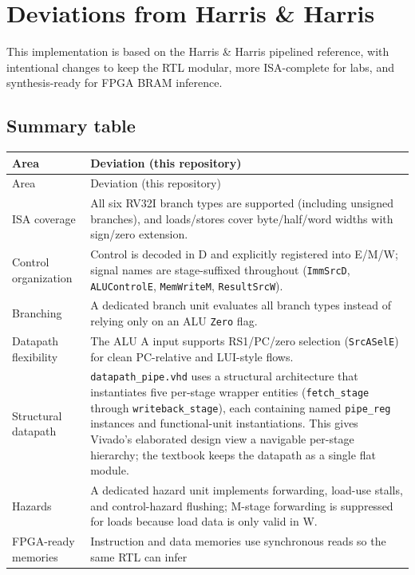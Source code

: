 \section{Deviations from Harris \& Harris}
\label{sec:textbook-deviations}

This implementation is based on the Harris \& Harris pipelined reference, with
intentional changes to keep the RTL modular, more ISA-complete for labs, and
synthesis-ready for FPGA BRAM inference.

\subsection{Summary table}
\begin{longtable}{@{}p{}p{}@{}}
\toprule
Area & Deviation (this repository) \\
\midrule
\endfirsthead
\toprule
Area & Deviation (this repository) \\
\midrule
\endhead
ISA coverage &
All six RV32I branch types are supported (including unsigned branches), and
loads/stores cover byte/half/word widths with sign/zero extension. \\
\addlinespace
Control organization &
Control is decoded in D and explicitly registered into E/M/W; signal names are
stage-suffixed throughout (\texttt{ImmSrcD}, \texttt{ALUControlE},
\texttt{MemWriteM}, \texttt{ResultSrcW}). \\
\addlinespace
Branching &
A dedicated branch unit evaluates all branch types instead of relying only on
an ALU \texttt{Zero} flag. \\
\addlinespace
Datapath flexibility &
The ALU A input supports RS1/PC/zero selection (\texttt{SrcASelE}) for clean
PC-relative and LUI-style flows. \\
\addlinespace
Structural datapath &
\texttt{datapath\_pipe.vhd} uses a structural architecture that instantiates
five per-stage wrapper entities (\texttt{fetch\_stage} through
\texttt{writeback\_stage}), each containing named \texttt{pipe\_reg} instances
and functional-unit instantiations. This gives Vivado's elaborated design view
a navigable per-stage hierarchy; the textbook keeps the datapath as a single
flat module. \\
\addlinespace
Hazards &
A dedicated hazard unit implements forwarding, load-use stalls, and control-hazard flushing; M-stage forwarding is suppressed for loads because load data is only valid in W. \\
\addlinespace
FPGA-ready memories &
Instruction and data memories use synchronous reads so the same RTL can infer

\end{longtable}
